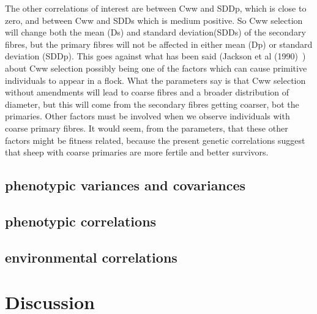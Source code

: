\documentclass[titlepage]{article}  %
\begin{document}
The other correlations of interest are between Cww and SDDp, which is close to zero, and between Cww and SDDs which is medium positive. So Cww selection will change both the mean (Ds) and standard deviation(SDDs) of the secondary fibres, but the primary fibres will not be affected in either mean (Dp) or standard deviation (SDDp).  This goes against what has been said (Jackson et al (1990)~\cite{jack:90}) about Cww selection possibly being one of the factors which can cause primitive individuals to appear in a flock.  What the parameters say is that Cww selection without amendments will lead to coarse fibres and a broader distribution of diameter, but this will come from the secondary fibres getting coarser, bot the primaries. Other factors must be involved when we observe individuals with coarse primary fibres. It would seem, from the parameters, that these other factors might be fitness related, because the present genetic correlations suggest that sheep with coarse primaries are more fertile and better survivors.

\subsection{phenotypic variances and covariances}
\subsection{phenotypic correlations}
\subsection{environmental correlations}

\section{Discussion}
\end{document}
